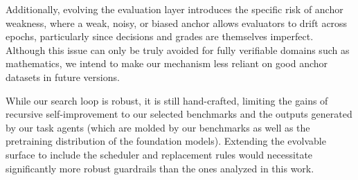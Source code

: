 Additionally, evolving the evaluation layer introduces the specific risk of anchor weakness, where a weak, noisy, or biased anchor allows evaluators to drift across epochs, particularly since \apres decisions and \imogradbench grades are themselves imperfect. Although this issue can only be truly avoided for fully verifiable domains such as mathematics, we intend to make our mechanism less reliant on good anchor datasets in future versions.  

While our search loop is robust, it is still hand-crafted, limiting the gains of recursive self-improvement to our selected benchmarks and the outputs generated by our task agents (which are molded by our benchmarks as well as the pretraining distribution of the foundation models). Extending the evolvable surface to include the scheduler and replacement rules would necessitate significantly more robust guardrails than the ones analyzed in this work. 
